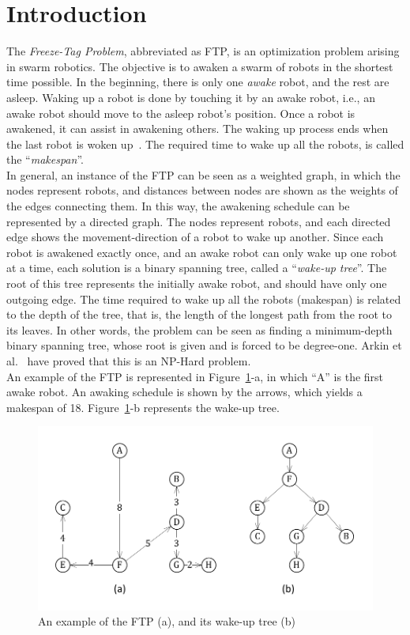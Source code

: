 \documentclass[review]{elsarticle}
\begin{document}
\section{Introduction}
The \textit{Freeze-Tag Problem}, abbreviated as FTP, is an optimization problem arising in swarm robotics. The objective is to awaken a swarm of robots in the shortest time possible. In the beginning, there is only one \textit{awake} robot, and the rest are asleep. Waking up a robot is done by touching it by an awake robot, i.e., an awake robot should move to the asleep robot's position. Once a robot is awakened, it can assist in awakening others. The waking up process ends when the last robot is woken up~\cite{Arkin2006}. The required time to wake up all the robots, is called the ``\textit{makespan}''.\\
In general, an instance of the FTP can be seen as a weighted graph, in which the nodes represent robots, and distances between nodes are shown as the weights of the edges connecting them. In this way, the awakening schedule can be represented by a directed graph. The nodes represent robots, and each directed edge shows the movement-direction of a robot to wake up another. Since each robot is awakened exactly once, and an awake robot can only wake up one robot at a time, each solution is a binary spanning tree, called a ``\textit{wake-up tree}''. The root of this tree represents the initially awake robot, and should have only one outgoing edge. The time required to wake up all the robots (makespan) is related to the depth of the tree, that is, the length of the longest path from the root to its leaves. In other words, the problem can be seen as finding a minimum-depth binary spanning tree, whose root is given and is forced to be degree-one. Arkin et al.~\cite{Arkin2006} have proved that this is an NP-Hard problem.\\
An example of the FTP is represented in Figure~\ref{fig:example}-a, in which ``A'' is the first awake robot. An awaking schedule is shown by the arrows, which yields a makespan of 18. Figure~\ref{fig:example}-b represents the wake-up tree.
\begin{figure}[h]
  \vspace{-10pt}
  \centering
  \includegraphics[scale=.7]{Figs/fig1.pdf}
  \vspace{-20pt}
  \caption{An example of the FTP (a), and its wake-up tree (b)}
  \label{fig:example}
\end{figure}
\end{document}

